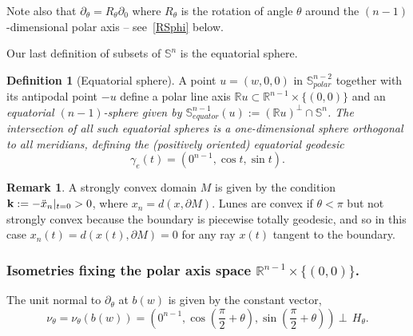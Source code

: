 \documentclass[11pt,a4paper,times]{amsart}
\theoremstyle{plain}
\theoremstyle{definition}
\newtheorem{definition}[thm]{Definition}%
\newtheorem{remark}{Remark}[section]
\numberwithin{equation}{section}
\newcommand{\R}{\mathbb{R}}
\newcommand{\Se}{\mathbb{S}}
\newcommand{\txtg}{\textcolor{green}}
\begin{document}
Note also that $\partial_{\theta}=R_{\theta}\partial_0$ where $R_{\theta}$ is the rotation of angle $\theta$ around
the $(n-1)$-dimensional polar axis -- see~\eqref{RSphi} below.

Our last definition of subsets of $\Se^{n}$ is the equatorial sphere.
\begin{definition}[Equatorial sphere] A point $u=(w,0,0)$ in $\Se^{n-2}_{polar}$ together with its
 antipodal point $-u$ define a polar line axis $\R u\subset \R^{n-1}\times\{(0,0)\}$ and an
 \em equatorial $(n-1)$-sphere \em given by 
$\Se^{n-1}_{equator}(u):=(\R u)^{\bot}\cap \Se^n$.
The intersection of all such equatorial spheres is a one-dimensional sphere  orthogonal to all meridians, defining the
(positively oriented) equatorial geodesic
 \begin{equation}\label{equatgeod}
 \gamma_{e}(t)=(0^{n-1}, \cos t, \sin t).
 \end{equation}
\end{definition}
 
\begin{remark} A strongly convex domain $M$ \cite[Definition 1.3.14 ]{sava} is given by the condition ${\bf k}:=-\ddot{x}_n|
 _{t=0}> 0 $,
where $x_n=d(x,\partial M)$. Lunes are convex if $\theta<\pi$ but not strongly convex because 
 the boundary is piecewise totally geodesic, and so in this case  $x_n(t)=d(x(t),\partial M)=0$ for 
 any  ray $x(t)$
 tangent to the boundary.
\end{remark} 
%

\subsubsection{Isometries fixing the polar axis space $\R^{n-1}\times\{(0,0)\}$.} 
The unit normal to
$\partial_{\theta}$ at $b(w)$ is given by the constant vector,
\begin{equation}\label{normal}
  \nu_{\theta}= \nu_{\theta}(b(w))=\left(0^{n-1},\cos\left(\frac{\pi}{2}+\theta\right), \sin\left(\frac{\pi}{2}+\theta\right)\right)~\bot~~ H_{\theta}.
  \end{equation}
\end{document}
